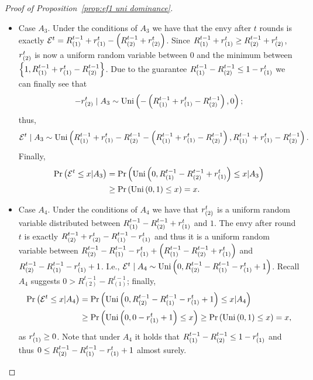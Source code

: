 \begin{proof}[Proof of Proposition~\ref{prop:ef1 uni dominance}]
\begin{itemize}
    \item Case $A_3$.
    Under the conditions of $A_3$ we have that the envy after $t$ rounds is exactly $\mathcal{E}^t = R^{t-1}_{(1)} + r_{(1)}^t -\left(R^{t-1}_{(2)} + r_{(2)}^t\right)$.
    Since $R^{t-1}_{(1)} + r_{(1)}^t \geq R^{t-1}_{(2)} + r_{(2)}^t$, $r_{(2)}^t$ is now a uniform random variable between $0$ and the minimum between $\left\{1,  R^{t-1}_{(1)} + r_{(1)}^t - R^{t-1}_{(2)}\right\}$.
    Due to the guarantee $R^{t-1}_{(1)} - R^{t-1}_{(2)} \leq 1 - r_{(1)}^t$ we can finally see that
    \[
    - r_{(2)}^t \mid A_3 \sim \text{Uni}\left(-\left(R^{t-1}_{(1)} + r_{(1)}^t - R^{t-1}_{(2)}\right), 0\right);
    \]
    thus,
    \[
    \mathcal{E}^t \mid A_3 \sim \text{Uni}\left(R^{t-1}_{(1)} + r_{(1)}^t -R^{t-1}_{(2)} -\left(R^{t-1}_{(1)} + r_{(1)}^t - R^{t-1}_{(2)}\right),  R^{t-1}_{(1)} + r_{(1)}^t -R^{t-1}_{(2)}\right).
    \]
    Finally,
    \begin{align*}
        \Pr\left( \mathcal{E}^t \leq x | A_3 \right) & = \Pr\left( \text{Uni}\left(0, R^{t-1}_{(1)} - R^{t-1}_{(2)}+ r_{(1)}^t\right) \leq x | A_3 \right)
        \\& \geq \Pr\left( \text{Uni}\left(0, 1\right) \leq x \right) = x.
    \end{align*}

    \item Case $A_4$.
    Under the conditions of $A_4$ we have that $r_{(2)}^t$ is a uniform random variable distributed between $R^{t-1}_{(1)} - R^{t-1}_{(2)} + r_{(1)}^t$ and $1$.
    The envy after round $t$ is exactly $R^{t-1}_{(2)} +r_{(2)}^t- R^{t-1}_{(1)}-r_{(1)}^t$ and thus it is a uniform random variable between $R^{t-1}_{(2)} - R^{t-1}_{(1)}-r_{(1)}^t +\left( R^{t-1}_{(1)} - R^{t-1}_{(2)} + r_{(1)}^t \right)$ and $R^{t-1}_{(2)} - R^{t-1}_{(1)}-r_{(1)}^t +1$.
    I.e., $\mathcal{E}^t \mid A_4 \sim \text{Uni}\left(0,R^{t-1}_{(2)} - R^{t-1}_{(1)}-r_{(1)}^t +1\right)$. Recall $A_4$ suggests $0 > R^{t-1}_{(2)} -R^{t-1}_{(1)} $; finally,
    \begin{align*}
        \Pr\left( \mathcal{E}^t \leq x | A_4 \right) & = \Pr\left( \text{Uni}\left(0, R^{t-1}_{(2)} - R^{t-1}_{(1)}-r_{(1)}^t +1\right) \leq x | A_4 \right)  \\& \geq
        \Pr\left( \text{Uni}\left(0, 0 - r_{(1)}^t +1\right) \leq x  \right) \geq \Pr\left( \text{Uni}\left(0, 1\right) \leq x \right) = x,
    \end{align*}
    as $r_{(1)}^t\geq 0$.
    Note that under $A_4$ it holds that $R^{t-1}_{(1)} - R^{t-1}_{(2)} \leq 1 - r_{(1)}^t $ and thus $0 \leq R^{t-1}_{(2)} - R^{t-1}_{(1)}-r_{(1)}^t +1$ almost surely.
    

\end{itemize}
\end{proof}
